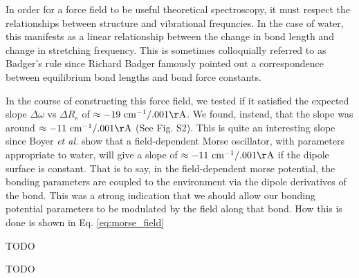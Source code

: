 \documentclass[journal=jacsat,manuscript=article]{achemso}
\begin{document}
In order for a force field to be useful theoretical spectroscopy, it must respect the relationships
between structure and vibrational frequncies. In the case of water, this manifests as a linear
relationship between the change in bond length and change in  stretching frequency.\cite{boyer2019beyond}
This is sometimes colloquially referred to as Badger's rule since Richard Badger famously pointed out a
correspondence between equilibrium bond lengths and bond force constants.\cite{badger1934relation}

In the course of constructing this force field, we tested if it satisfied the expected slope
$\Delta\omega$ vs $\Delta R_e$ of $\approx -19\ \mathrm{cm^{-1}/.001\AA}$\cite{boyer2019beyond}.
We found, instead, that the slope was around $\approx -11\ \mathrm{cm^{-1}/.001\AA}$ (See Fig. S2).
This is quite an interesting slope since Boyer \textit{et al.} show that a field-dependent Morse
oscillator, with parameters appropriate to water, will give a slope of $\approx -11\ \mathrm{cm^{-1}/.001\AA}$
if the dipole surface is constant. That is to say, in the field-dependent morse potential, the
bonding parameters are coupled to the environment via the dipole derivatives of the bond.
This was a strong indication that we should allow our bonding potential parameters to be modulated
by the field along that bond. How this is done is shown in Eq. \ref{eq:morse_field}

\begin{acknowledgement}

TODO

\end{acknowledgement}

\begin{suppinfo}

TODO

\end{suppinfo}


\end{document}
